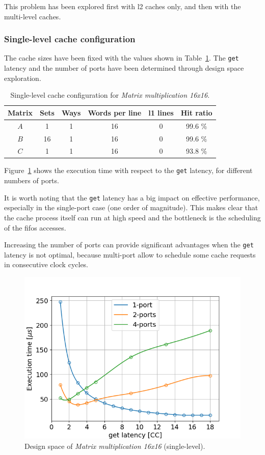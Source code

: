 \documentclass[11pt,a4paper,oneside]{memoir}
\begin{document}
This problem has been explored first with \ac{l2} caches only, and then with the
multi-level caches.

\subsubsection{Single-level cache configuration}
The cache sizes have been fixed with the values shown in
Table~\ref{tab:matmul_16_no_l1_config}. The \texttt{get} latency and the number
of ports have been determined through design space exploration.

\begin{table}[H]
	\begin{center}
		\begin{tabular}{cccccc}
			\hline
			\rowcolor{gray!50}
			\textbf{Matrix} &
			\textbf{Sets} & \textbf{Ways} & \textbf{Words per line} &
			\textbf{\ac{l1} lines} & \textbf{Hit ratio} \\
			\hline
			$A$ & 1 & 1 & 16 & 0 & 99.6 \% \\
			\rowcolor{gray!25}
			$B$ & 16 & 1 & 16 & 0 & 99.6 \% \\
			$C$ & 1 & 1 & 16 & 0 & 93.8 \% \\
			\hline
		\end{tabular}
	\end{center}
	\caption{Single-level cache configuration for \emph{Matrix
	multiplication 16x16}.}
	\label{tab:matmul_16_no_l1_config}
\end{table}

Figure~\ref{fig:matmul_16_no_l1_space} shows the execution time with respect to
the \texttt{get} latency, for different numbers of ports.

It is worth noting that the \texttt{get} latency has a big impact on effective
performance, especially in the single-port case (one order of magnitude).
This makes clear that the cache process itself can run at high speed and the
bottleneck is the scheduling of the \acp{fifo} accesses.

Increasing the number of ports can provide significant advantages when the
\texttt{get} latency is not optimal, because multi-port allow to schedule some
cache requests in consecutive clock cycles.

\begin{figure}[H]
	\centering
	\includegraphics[width=.7\textwidth]{matmul_16_multiport_latency}
	\caption{Design space of \emph{Matrix multiplication 16x16}
	(single-level).}
	\label{fig:matmul_16_no_l1_space}
\end{figure}
\end{document}
